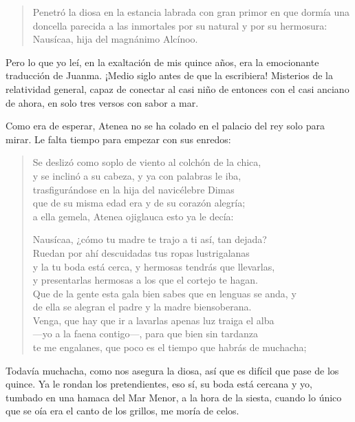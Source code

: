\documentclass[11pt,a4paper]{article}
\begin{document}
\begin{quote}
Penetró la diosa en la estancia labrada con gran primor en que dormía una doncella parecida a las inmortales por su natural y por su hermosura: Nausícaa, hija del magnánimo Alcínoo.
\end{quote}

Pero lo que yo leí, en la exaltación de mis quince años, era la emocionante traducción de Juanma. ¡Medio siglo antes de que la escribiera! Misterios de la relatividad general, capaz de conectar al casi niño de entonces con el casi anciano de ahora, en solo tres versos con sabor a mar.

Como era de esperar, Atenea no se ha colado en el palacio del rey solo para mirar. Le falta tiempo para empezar con sus enredos:

\begin{verse}
Se deslizó como soplo de viento al colchón de la chica,\\
y se inclinó a su cabeza, y ya con palabras le iba,\\
trasfigurándose en la hija del navicélebre Dimas\\
que de su misma edad era y de su corazón alegría;\\
a ella gemela, Atenea ojiglauca esto ya le decía:

Nausícaa, ¿cómo tu madre te trajo a ti así, tan dejada?\\
Ruedan por ahí descuidadas tus ropas lustrigalanas\\
y la tu boda está cerca, y hermosas tendrás que llevarlas,\\
y presentarlas hermosas a los que el cortejo te hagan.\\
Que de la gente esta gala bien sabes que en lenguas se anda, y\\
de ella se alegran el padre y la madre biensoberana.\\
Venga, que hay que ir a lavarlas apenas luz traiga el alba\\
---yo a la faena contigo---, para que bien sin tardanza\\
te me engalanes, que poco es el tiempo que habrás de muchacha;
\end{verse}

Todavía muchacha, como nos asegura la diosa, así que es difícil que pase de los quince. Ya le rondan los pretendientes, eso sí, su boda está cercana y yo, tumbado en una hamaca del Mar Menor, a la hora de la siesta, cuando lo único que se oía era el canto de los grillos, me moría de celos.
\end{document}
